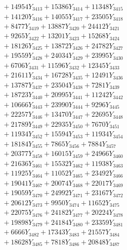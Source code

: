 \documentclass[a4paper,10pt]{article}
\begin{document}
{\begin{align}
&\;  + 14954 Y_{3413} + 15386 Y_{3414} + 11348 Y_{3415} \\[0.3ex]
&\;  + 14120 Y_{3416} + 14055 Y_{3417} + 23505 Y_{3418} \\[0.5ex]\allowbreak
&\;  + 8477 Y_{3419} + 13887 Y_{3420} + 24412 Y_{3421} \\[0.3ex]
&\;  + 9265 Y_{3422} + 13201 Y_{3423} + 15268 Y_{3424} \\[0.3ex]
&\;  + 18126 Y_{3425} + 13872 Y_{3426} + 24782 Y_{3427} \\[0.3ex]
&\;  + 19559 Y_{3428} + 24034 Y_{3429} + 23995 Y_{3430} \\[0.3ex]
&\;  + 6706 Y_{3431} + 11596 Y_{3432} + 12345 Y_{3433} \\[0.3ex]
&\;  + 21611 Y_{3434} + 16728 Y_{3435} + 12491 Y_{3436} \\[0.3ex]
&\;  + 13787 Y_{3437} + 23504 Y_{3438} + 7281 Y_{3439} \\[0.3ex]
&\;  + 18723 Y_{3440} + 20995 Y_{3441} + 11242 Y_{3442} \\[0.3ex]
&\;  + 10666 Y_{3443} + 23990 Y_{3444} + 9296 Y_{3445} \\[0.3ex]
&\;  + 22257 Y_{3446} + 13470 Y_{3447} + 22695 Y_{3448} \\[0.5ex]\allowbreak
&\;  + 21789 Y_{3449} + 22935 Y_{3450} + 7670 Y_{3451} \\[0.3ex]
&\;  + 11934 Y_{3452} + 15594 Y_{3453} + 11934 Y_{3454} \\[0.3ex]
&\;  + 18184 Y_{3455} + 7865 Y_{3456} + 7884 Y_{3457} \\[0.3ex]
&\;  + 20377 Y_{3458} + 16015 Y_{3459} + 24966 Y_{3460} \\[0.3ex]
&\;  + 21636 Y_{3461} + 15532 Y_{3462} + 11938 Y_{3463} \\[0.3ex]
&\;  + 11925 Y_{3464} + 11052 Y_{3465} + 23492 Y_{3466} \\[0.3ex]
&\;  + 19041 Y_{3467} + 20074 Y_{3468} + 22017 Y_{3469} \\[0.3ex]
&\;  + 19059 Y_{3470} + 24992 Y_{3471} + 23167 Y_{3472} \\[0.3ex]
&\;  + 20612 Y_{3473} + 9950 Y_{3474} + 11652 Y_{3475} \\[0.3ex]
&\;  + 22075 Y_{3476} + 24182 Y_{3477} + 20224 Y_{3478} \\[0.5ex]\allowbreak
&\;  + 19898 Y_{3479} + 24184 Y_{3480} + 23359 Y_{3481} \\[0.3ex]
&\;  + 6666 Y_{3482} + 17343 Y_{3483} + 21557 Y_{3484} \\[0.3ex]
&\;  + 18628 Y_{3485} + 7818 Y_{3486} + 20848 Y_{3487} \\[0.3ex]

\end{align}}
\end{document}
